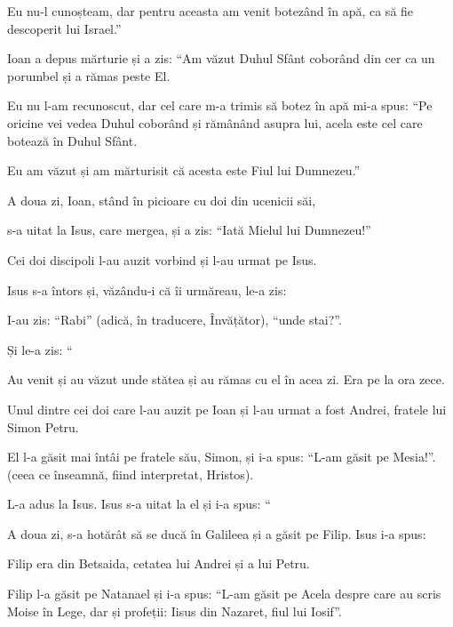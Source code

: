 {Eu nu-l cunoșteam, dar pentru aceasta am venit botezând în apă, ca să fie descoperit lui Israel.”

Ioan a depus mărturie și a zis: “Am văzut Duhul Sfânt coborând din cer ca un porumbel și a rămas peste El.

Eu nu l-am recunoscut, dar cel care m-a trimis să botez în apă mi-a spus: “Pe oricine vei vedea Duhul coborând și rămânând asupra lui, acela este cel care botează în Duhul Sfânt.

Eu am văzut și am mărturisit că acesta este Fiul lui Dumnezeu.”


\par }{\PP {}A doua zi, Ioan, stând în picioare cu doi din ucenicii săi,

s-a uitat la Isus, care mergea, și a zis: “Iată Mielul lui Dumnezeu!”

Cei doi discipoli l-au auzit vorbind și l-au urmat pe Isus.

Isus s-a întors și, văzându-i că îi urmăreau, le-a zis:
{}

\par }{\PP I-au zis: “Rabi” (adică, în traducere, Învățător), “unde stai?”.


\par }{\PP {}Și le-a zis: “{}

\par }{\PP Au venit și au văzut unde stătea și au rămas cu el în acea zi. Era pe la ora zece.

Unul dintre cei doi care l-au auzit pe Ioan și l-au urmat a fost Andrei, fratele lui Simon Petru.

El l-a găsit mai întâi pe fratele său, Simon, și i-a spus: “L-am găsit pe Mesia!”. (ceea ce înseamnă, fiind interpretat, Hristos).

L-a adus la Isus. Isus s-a uitat la el și i-a spus: “{}


\par }{\PP {}A doua zi, s-a hotărât să se ducă în Galileea și a găsit pe Filip. Isus i-a spus:
{}

Filip era din Betsaida, cetatea lui Andrei și a lui Petru.

Filip l-a găsit pe Natanael și i-a spus: “L-am găsit pe Acela despre care au scris Moise în Lege, dar și profeții: Iisus din Nazaret, fiul lui Iosif”.


}
